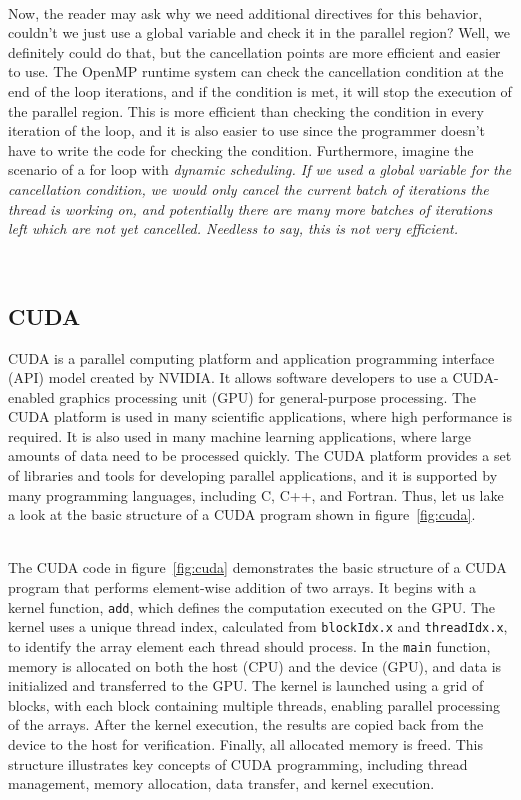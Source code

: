 \documentclass[../../main.tex]{subfiles}
\begin{document}
~\\
Now, the reader may ask why we need additional directives for this behavior, couldn't we just use a global variable and check it in the parallel region? Well, we definitely could do that, but the cancellation points are more efficient and easier to use. The OpenMP runtime system can check the cancellation condition at the end of the loop iterations, and if the condition is met, it will stop the execution of the parallel region. This is more efficient than checking the condition in every iteration of the loop, and it is also easier to use since the programmer doesn't have to write the code for checking the condition. Furthermore, imagine the scenario of a for loop with \em dynamic \em scheduling. If we used a global variable for the cancellation condition, we would only cancel the current batch of iterations the thread is working on, and potentially there are many more batches of iterations left which are not yet cancelled. Needless to say, this is not very efficient.

~\\
\subsection{CUDA}
CUDA is a parallel computing platform and application programming interface (API) model created by NVIDIA. It allows software developers to use a CUDA-enabled graphics processing unit (GPU) for general-purpose processing. The CUDA platform is used in many scientific applications, where high performance is required. It is also used in many machine learning applications, where large amounts of data need to be processed quickly. The CUDA platform provides a set of libraries and tools for developing parallel applications, and it is supported by many programming languages, including C, C++, and Fortran. Thus, let us lake a look at the basic structure of a CUDA program shown in figure~\ref{fig:cuda}.

~\\
The CUDA code in figure~\ref{fig:cuda} demonstrates the basic structure of a CUDA program that performs element-wise addition of two arrays. It begins with a kernel function, \texttt{add}, which defines the computation executed on the GPU. The kernel uses a unique thread index, calculated from \texttt{blockIdx.x} and \texttt{threadIdx.x}, to identify the array element each thread should process. In the \texttt{main} function, memory is allocated on both the host (CPU) and the device (GPU), and data is initialized and transferred to the GPU. The kernel is launched using a grid of blocks, with each block containing multiple threads, enabling parallel processing of the arrays. After the kernel execution, the results are copied back from the device to the host for verification. Finally, all allocated memory is freed. This structure illustrates key concepts of CUDA programming, including thread management, memory allocation, data transfer, and kernel execution.
\end{document}
